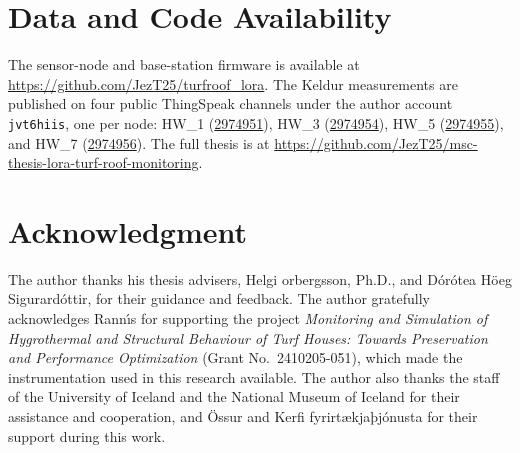 \section*{Data and Code Availability}
The sensor-node and base-station firmware is available at \url{https://github.com/JezT25/turfroof_lora}. The Keldur measurements are published on four public ThingSpeak channels under the author account \texttt{jvt6hiis}, one per node: HW\_1 (\href{https://thingspeak.mathworks.com/channels/2974951}{2974951}), HW\_3 (\href{https://thingspeak.mathworks.com/channels/2974954}{2974954}), HW\_5 (\href{https://thingspeak.mathworks.com/channels/2974955}{2974955}), and HW\_7 (\href{https://thingspeak.mathworks.com/channels/2974956}{2974956}). The full thesis is at \url{https://github.com/JezT25/msc-thesis-lora-turf-roof-monitoring}.

\section*{Acknowledgment}
The author thanks his thesis advisers, Helgi {\TH}orbergsson, Ph.D., and D{\'o}r{\'o}tea H{\"o}eg Sigur{\dh}ard{\'o}ttir, for their guidance and feedback. The author gratefully acknowledges Rann{\'\i}s for supporting the project \textit{Monitoring and Simulation of Hygrothermal and Structural Behaviour of Turf Houses: Towards Preservation and Performance Optimization} (Grant No.~2410205-051), which made the instrumentation used in this research available. The author also thanks the staff of the University of Iceland and the National Museum of Iceland for their assistance and cooperation, and Össur and Kerfi fyrirtækjaþjónusta for their support during this work.
